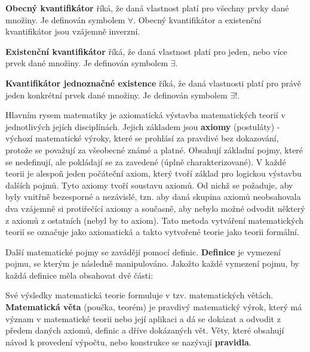 {\bf Obecný kvantifikátor} říká, že daná vlastnost platí pro všechny prvky dané množiny. Je definován symbolem $\forall$. Obecný kvantifikátor a existenční kvantifikátor jsou vzájemně inverzní.

{\bf Existenční kvantifikátor} říká, že daná vlastnost platí pro jeden, nebo více prvek dané množiny. Je definován symbolem $\exists$.

{\bf Kvantifikátor jednoznačné existence} říká, že daná vlastnosti platí pro právě jeden konkrétní prvek dané množiny. Je definován symbolem $\exists!$.



Hlavním rysem matematiky je axiomatická výstavba matematických teorií v jednotlivých jejích disciplínách. Jejich základem jsou {\bf axiomy} (postuláty) - výchozí matematické výroky, které se prohlásí za pravdivé bez dokazování, protože se považují za všeobecné známé a platné. Obsahují základní pojmy, které se nedefinují, ale pokládají se za zavedené (úplně charakterizované). V každé teorii je alespoň jeden počáteční axiom, který tvoří základ pro logickou výstavbu dalších pojmů. Tyto axiomy tvoří soustavu axiomů. Od nichž se požaduje, aby byly vnitřně bezesporné a nezávislé, tzn. aby daná skupina axiomů neobsahovala dva vzájemně si protiřečící axiomy a současně, aby nebylo možné odvodit některý z axiomů z ostatních (nebyl by to axiom). Tato metoda vytváření matematických teorií se označuje jako axiomatická a takto vytvořené teorie jako teorii formální. 

Další matematické pojmy se zavádějí pomocí definic. {\bf Definice} je vymezení pojmu, se kterým je následně manipulováno. Jakožto každé vymezení pojmu, by každá definice měla obsahovat dvě části:

\vskip 4mm
\vskip 4mm

Své výsledky matematická teorie formuluje v tzv. matematických větách. {\bf Matematická věta} (poučka, teorém) je pravdivý matematický výrok, který má význam v matematické teorii nebo její aplikaci a dá se dokázat a odvodit z předem daných axiomů, definic a dříve dokázaných vět. Věty, které obsahují návod k provedení výpočtu, nebo konstrukce se nazývají {\bf pravidla}.

